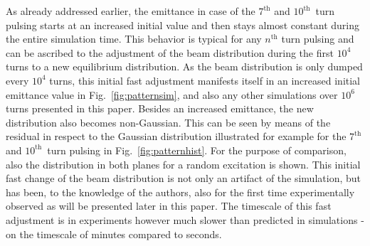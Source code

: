 \documentclass[%
 reprint,
 amsmath,amssymb,
 aps,
prstab,
]{revtex4-1}
\begin{document}
As already addressed earlier, the emittance in case of the $7^{\mathrm{th}}$ and $10^{\mathrm{th}}$~turn pulsing starts at an increased initial value and then stays almost constant during the entire simulation time. This behavior is typical for any $n^{\mathrm{th}}$ turn pulsing and can be ascribed to the adjustment of the beam distribution during the first $10^4$ turns to a new equilibrium distribution. As the beam distribution is only dumped every $10^4$ turns, this initial fast adjustment manifests itself in an increased initial emittance value in Fig.~\ref{fig:patternsim}, and also any other simulations over $10^6$ turns presented in this paper. Besides an increased emittance, the new distribution also becomes non-Gaussian. This can be seen by means of the residual in respect to the Gaussian distribution illustrated for example for the $7^{\mathrm{th}}$ and $10^{\mathrm{th}}$~turn pulsing in Fig.~\ref{fig:patternhist}. For the purpose of comparison, also the distribution in both planes for a random excitation is shown. This initial fast change of the beam distribution is not only an artifact of the simulation, but has been, to the knowledge of the authors, also for the first time experimentally observed as will be presented later in this paper. The timescale of this fast adjustment is in experiments however much slower than predicted in simulations - on the timescale of minutes compared to seconds. 
\end{document}

